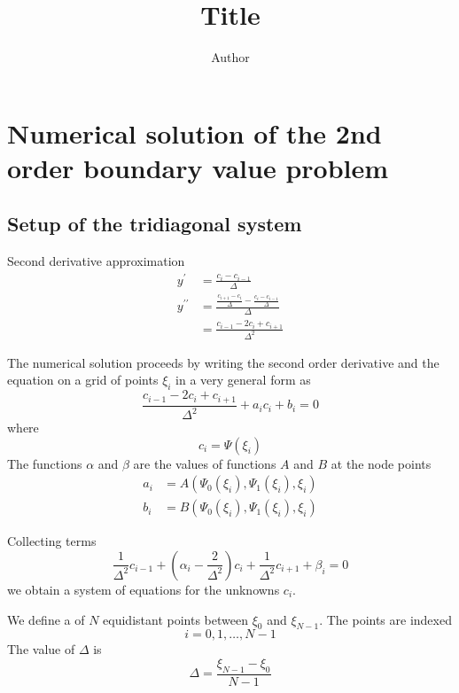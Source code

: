 \documentclass[12pt]{article}%
\begin{document}
\title{Title}
\author{Author}
\maketitle

\section{Numerical solution of the 2nd order boundary value problem}

\subsection{Setup of the tridiagonal system}

Second derivative approximation%
\begin{align}
y^{\prime}  & =\frac{c_{i}-c_{i-1}}{\Delta}\\
y^{\prime\prime}  & =\frac{\frac{c_{i+1}-c_{i}}{\Delta}-\frac{c_{i}-c_{i-1}%
}{\Delta}}{\Delta}\\
& =\frac{c_{i-1}-2c_{i}+c_{i+1}}{\Delta^{2}}%
\end{align}


The numerical solution proceeds by writing the second order derivative and the
equation on a grid of points $\xi_{i}$ in a very general form as%
\begin{equation}
\frac{c_{i-1}-2c_{i}+c_{i+1}}{\Delta^{2}}+a_{i}c_{i}+b_{i}=0
\label{eq:2nd-order-BVP-ODE-discretization}%
\end{equation}
where%
\begin{equation}
c_{i}=\Psi\left(  \xi_{i}\right)
\end{equation}
The functions $\alpha$ and $\beta$ are the values of functions $A$ and $B$ at
the node points%
\begin{align}
a_{i}  &  =A\left(  \Psi_{0}\left(  \xi_{i}\right)  ,\Psi_{1}\left(  \xi
_{i}\right)  ,\xi_{i}\right) \\
b_{i}  &  =B\left(  \Psi_{0}\left(  \xi_{i}\right)  ,\Psi_{1}\left(  \xi
_{i}\right)  ,\xi_{i}\right)
\end{align}


Collecting terms%
\begin{equation}
\frac{1}{\Delta^{2}}c_{i-1}+\left(  \alpha_{i}-\frac{2}{\Delta^{2}}\right)
c_{i}+\frac{1}{\Delta^{2}}c_{i+1}+\beta_{i}=0
\end{equation}
we obtain a system of equations for the unknowns $c_{i}$.

We define a of $N$ equidistant points between $\xi_{0}$ and $\xi_{N-1}$. The
points are indexed
\begin{equation}
i=0,1,\ldots,N-1
\end{equation}
The value of $\Delta$ is
\begin{equation}
\Delta=\frac{\xi_{N-1}-\xi_{0}}{N-1}%
\end{equation}
\end{document}
